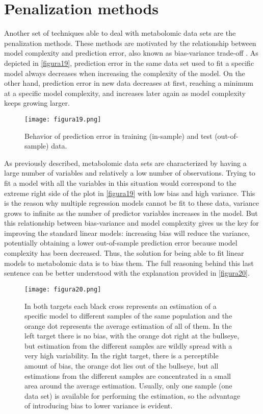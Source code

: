 \section{Penalization methods}
\label{penalmethods}
Another set of techniques able to deal with metabolomic data sets are the penalization methods. These methods are motivated by the relationship between model complexity and prediction error, also known as bias-variance trade-off \parencite{hastie2001model}. As depicted in \autoref{figura19}, prediction error in the same data set used to fit a specific model always decreases when increasing the complexity of the model. On the other hand, prediction error in new data decreases at first, reaching a minimum at a specific model complexity, and increases later again as model complexity keeps growing larger.

\begin{figure}[hbtp]
	\centering
\texttt{[image: figura19.png]}
\caption{Behavior of prediction error in training (in-sample) and test (out-of-sample) data.}
\label{figura19}
\end{figure}

As previously described, metabolomic data sets are characterized by having a large number of variables and relatively a low number of observations. Trying to fit a model with all the variables in this situation would correspond to the extreme right side of the plot in \autoref{figura19} with low bias and high variance. This is the reason why multiple regression models cannot be fit to these data, variance grows to infinite as the number of predictor variables increases in the model. But this relationship between bias-variance and model complexity gives us the key for improving the standard linear models: increasing bias will reduce the variance, potentially obtaining a lower out-of-sample prediction error because model complexity has been decreased. Thus, the solution for being able to fit linear models to metabolomic data is to bias them. The full reasoning behind this last sentence can be better understood with the explanation provided in \autoref{figura20}.

\begin{figure}[hbtp]
	\centering
\texttt{[image: figura20.png]}
\caption{In both targets each black cross represents an estimation of a specific model to different samples of the same population and the orange dot represents the average estimation of all of them. In the left target there is no bias, with the orange dot right at the bullseye, but estimation from the different samples are wildly spread with a very high variability. In the right target, there is a perceptible amount of bias, the orange dot lies out of the bullseye, but all estimations from the different samples are concentrated in a small area around the average estimation. Usually, only one sample (one data set) is available for performing the estimation, so the advantage of introducing bias to lower variance is evident.}
\label{figura20}
\end{figure}

